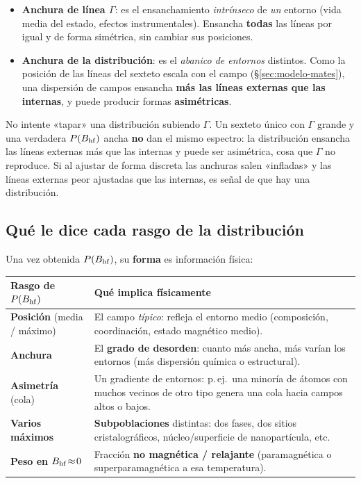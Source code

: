 \begin{itemize}[nosep]
  \item \textbf{Anchura de línea $\Gamma$}: es el ensanchamiento \emph{intrínseco}
        de \emph{un} entorno (vida media del estado, efectos instrumentales).
        Ensancha \textbf{todas} las líneas por igual y de forma simétrica, sin
        cambiar sus posiciones.
  \item \textbf{Anchura de la distribución}: es el \emph{abanico de entornos}
        distintos. Como la posición de las líneas del sexteto escala con el campo
        (§\ref{sec:modelo-mates}), una dispersión de campos ensancha
        \textbf{más las líneas externas que las internas}, y puede producir
        formas \textbf{asimétricas}.
\end{itemize}

\begin{aviso}
No intente «tapar» una distribución subiendo $\Gamma$. Un sexteto único con
$\Gamma$ grande y una verdadera $P(B_{\mathrm{hf}})$ ancha \textbf{no} dan el mismo espectro:
la distribución ensancha las líneas externas más que las internas y puede ser
asimétrica, cosa que $\Gamma$ no reproduce. Si al ajustar de forma discreta las
anchuras salen «infladas» y las líneas externas peor ajustadas que las internas,
es señal de que hay una distribución.
\end{aviso}

\subsection{Qué le dice cada rasgo de la distribución}

Una vez obtenida $P(B_{\mathrm{hf}})$, su \textbf{forma} es información física:

\begin{center}
\begin{tabular}{@{}lp{}@{}}
\toprule
\textbf{Rasgo de $P(B_{\mathrm{hf}})$} & \textbf{Qué implica físicamente} \\
\midrule
\textbf{Posición} (media / máximo) & El campo \emph{típico}: refleja el entorno
medio (composición, coordinación, estado magnético medio). \\[3pt]
\textbf{Anchura} & El \textbf{grado de desorden}: cuanto más ancha, más varían los
entornos (más dispersión química o estructural). \\[3pt]
\textbf{Asimetría} (cola) & Un gradiente de entornos: p.\,ej.\ una minoría de
átomos con muchos vecinos de otro tipo genera una cola hacia campos altos o bajos. \\[3pt]
\textbf{Varios máximos} & \textbf{Subpoblaciones} distintas: dos fases, dos sitios
cristalográficos, núcleo/superficie de nanopartícula, etc. \\[3pt]
\textbf{Peso en $B_{\mathrm{hf}}\!\approx\!0$} & Fracción \textbf{no magnética / relajante}
(paramagnética o superparamagnética a esa temperatura). \\
\bottomrule
\end{tabular}
\end{center}

